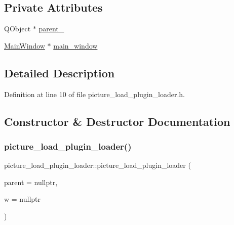 \subsection*{Private Attributes}
\begin{DoxyCompactItemize}
\item 
Q\+Object $\ast$ \hyperlink{classpicture__load__plugin__loader_a5d0e09fbe0b7b061a785216ee57b5d3b}{parent\+\_\+}
\item 
\hyperlink{classMainWindow}{Main\+Window} $\ast$ \hyperlink{classpicture__load__plugin__loader_a6a6c98c4ff9b1506b82a6a87e2b2103b}{main\+\_\+window}
\end{DoxyCompactItemize}


\subsection{Detailed Description}


Definition at line 10 of file picture\+\_\+load\+\_\+plugin\+\_\+loader.\+h.



\subsection{Constructor \& Destructor Documentation}
\mbox{\label{classpicture__load__plugin__loader_ac548a57f4e400bc5612428a752a1d59e}} 
\subsubsection{\texorpdfstring{picture\+\_\+load\+\_\+plugin\+\_\+loader()}{picture\_load\_plugin\_loader()}}
{\footnotesize\ttfamily picture\+\_\+load\+\_\+plugin\+\_\+loader\+::picture\+\_\+load\+\_\+plugin\+\_\+loader (\begin{DoxyParamCaption}\item[{Q\+Object $\ast$}]{parent = {\ttfamily nullptr},  }\item[{\hyperlink{classMainWindow}{Main\+Window} $\ast$}]{w = {\ttfamily nullptr} }\end{DoxyParamCaption})\hspace{0.3cm}{\ttfamily [explicit]}}



